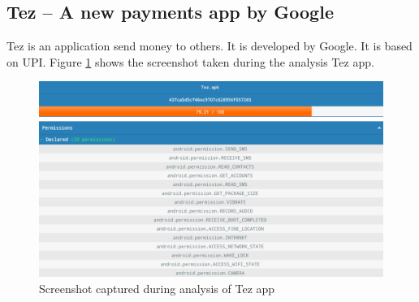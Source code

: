 \subsection{Tez – A new payments app by Google}
Tez is an application send money to others. It is developed by Google. It is based on UPI. Figure \ref{fig:tez} shows the screenshot taken during the analysis Tez app.
\begin{figure}[!h]
  \centering
  \includegraphics [scale=0.5] {tez.png}
  \caption{Screenshot captured during analysis of Tez app}
  \label{fig:tez}
\end{figure}
